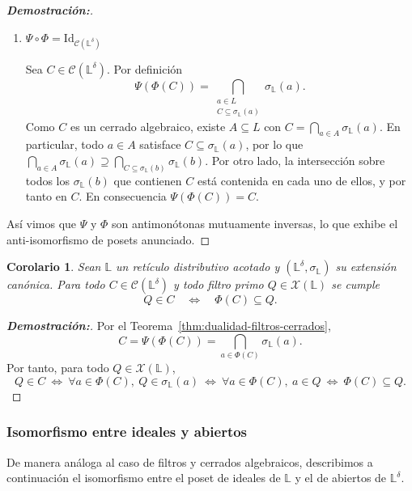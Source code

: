 \documentclass[12pt]{book}
\newtheorem{corollary}[theorem]{Corolario}
\newcommand{\Id}{\mathrm{Id}}
\begin{document}
\begin{proof}[\textbf{Demostración:}]
\begin{enumerate}
\item $\Psi\circ\Phi=\Id_{\mathcal{C}(\mathbb{L}^\delta)}$

Sea \(C\in\mathcal C(\mathbb L^\delta)\). Por definición
\[
\Psi(\Phi(C))
=\bigcap_{\substack{a\in L\\ C\subseteq\sigma_{\mathbb{L}}(a)}}\sigma_{\mathbb{L}}(a).
\]
Como \(C\) es un cerrado algebraico, existe \(A\subseteq L\) con \(C=\bigcap_{a\in A}\sigma_{\mathbb{L}}(a)\).
En particular, todo \(a\in A\) satisface \(C\subseteq\sigma_{\mathbb{L}}(a)\), por lo que
\(\bigcap_{a\in A}\sigma_{\mathbb{L}}(a)\supseteq\bigcap_{C\subseteq\sigma_{\mathbb{L}}(b)}\sigma_{\mathbb{L}}(b)\).
Por otro lado, la intersección sobre todos los \(\sigma_{\mathbb{L}}(b)\) que contienen
\(C\) está contenida en cada uno de ellos, y por tanto en \(C\). En consecuencia
\(\Psi(\Phi(C))=C\).
\end{enumerate}
\medskip
Así vimos que \(\Psi\) y \(\Phi\) son antimonótonas mutuamente inversas,
lo que exhibe el anti-isomorfismo de posets anunciado.
\end{proof}

\begin{corollary}\label{cor:caracterizacion-C-F}
Sean $\mathbb{L}$ un retículo distributivo acotado y 
$(\mathbb{L}^{\delta},\sigma_{\mathbb{L}})$ su extensión canónica.
Para todo $C\in\mathcal{C}(\mathbb{L}^\delta)$ y todo filtro primo 
$Q\in\mathcal{X}(\mathbb{L})$ se cumple
\[
Q \in C 
\quad\Longleftrightarrow\quad 
\Phi(C)\subseteq Q.
\]
\end{corollary}

\begin{proof}[\textbf{Demostración:}]
Por el Teorema~\ref{thm:dualidad-filtros-cerrados}, 
\[
C=\Psi(\Phi(C))
=\bigcap_{a\in \Phi(C)}\sigma_{\mathbb{L}}(a).
\]
Por tanto, para todo \(Q\in\mathcal{X}(\mathbb L)\),
\[
Q\in C
\ \Longleftrightarrow\
\forall a\in\Phi(C),\ Q\in\sigma_{\mathbb{L}}(a)
\ \Longleftrightarrow\
\forall a\in\Phi(C),\ a\in Q
\ \Longleftrightarrow\
\Phi(C)\subseteq Q.
\]
\end{proof}

\subsubsection{Isomorfismo entre ideales y abiertos}

De manera análoga al caso de filtros y cerrados algebraicos, describimos a continuación el isomorfismo entre el poset de ideales de \(\mathbb{L}\) y el de abiertos de \(\mathbb{L}^\delta\).
\end{document}
